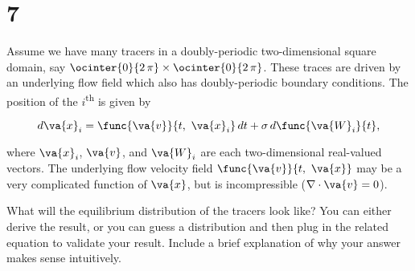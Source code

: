 \section{7}

Assume we have many tracers in a doubly-periodic two-dimensional square domain, say $\ocinter{0}{2\,\pi} \times \ocinter{0}{2\,\pi}$. These traces are driven by an underlying flow field which also has doubly-periodic boundary conditions. The position of the $i$\textsuperscript{th} is given by

\begin{equation}
	d\va{x}_i = \func{\va{v}}{t,\ \va{x}_i}\,dt + \sigma\,d\func{\va{W}_i}{t},
\end{equation}

where $\va{x}_{i}$, $\va{v}$, and $\va{W}_{i}$ are each two-dimensional real-valued vectors. The underlying flow velocity field $\func{\va{v}}{t,\ \va{x}}$ may be a very complicated function of $\va{x}$, but is incompressible ($\nabla \cdot \va{v} = 0$).

What will the equilibrium distribution of the tracers look like? You can either derive the result, or you can guess a distribution and then plug in the related equation to validate your result. Include a brief explanation of why your answer makes sense intuitively.

